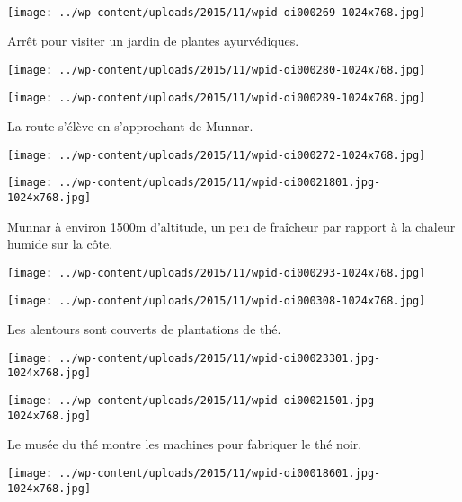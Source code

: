 ~\\
\begin{center} \texttt{[image: ../wp-content/uploads/2015/11/wpid-oi000269-1024x768.jpg]} \end{center}

 Arrêt pour visiter un jardin de plantes ayurvédiques. 
\begin{center} \texttt{[image: ../wp-content/uploads/2015/11/wpid-oi000280-1024x768.jpg]} \end{center}
\begin{center} \texttt{[image: ../wp-content/uploads/2015/11/wpid-oi000289-1024x768.jpg]} \end{center}

 La route s'élève en s'approchant de Munnar. 
\begin{center} \texttt{[image: ../wp-content/uploads/2015/11/wpid-oi000272-1024x768.jpg]} \end{center}
\begin{center} \texttt{[image: ../wp-content/uploads/2015/11/wpid-oi00021801.jpg-1024x768.jpg]} \end{center}

 Munnar à environ 1500m d'altitude, un peu de fraîcheur par rapport à la chaleur humide sur la côte. 
\begin{center} \texttt{[image: ../wp-content/uploads/2015/11/wpid-oi000293-1024x768.jpg]} \end{center}
\begin{center} \texttt{[image: ../wp-content/uploads/2015/11/wpid-oi000308-1024x768.jpg]} \end{center}

 Les alentours sont couverts de plantations de thé. 
\begin{center} \texttt{[image: ../wp-content/uploads/2015/11/wpid-oi00023301.jpg-1024x768.jpg]} \end{center}
\begin{center} \texttt{[image: ../wp-content/uploads/2015/11/wpid-oi00021501.jpg-1024x768.jpg]} \end{center}

 Le musée du thé montre les machines pour fabriquer le thé noir. 
\begin{center} \texttt{[image: ../wp-content/uploads/2015/11/wpid-oi00018601.jpg-1024x768.jpg]} \end{center}
\vspace{-\topsep}
\pagebreak
 
